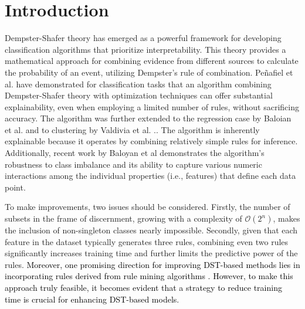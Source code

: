 \documentclass[10pt,a4paper,oneside]{article}
\begin{document}
{\selectfont
\begin{keywords}
{\fontsize{9pt}{9pt}\selectfont{
Dempster-Shafer Theory, Interpretability, KMeans, Mass Assignment Functions, Classification}}
\end{keywords}
}

{\selectfont
\begin{category}
{\fontsize{9pt}{9pt}\selectfont{
I.2.6, I.5, G.3
}}
\end{category}}




\section{Introduction}\label{sec1}
Dempster-Shafer theory \cite{dst} has emerged as a powerful framework for developing classification algorithms that prioritize interpretability. This theory provides a mathematical approach for combining evidence from different sources to calculate the probability of an event, utilizing Dempster's rule of combination. Peñafiel et al. \cite{sergio} have demonstrated {\color{black} for classification tasks} that an algorithm combining Dempster-Shafer theory with optimization techniques can offer substantial explainability, even when employing a limited number of rules, without sacrificing accuracy. {\color{black} The algorithm was further extended to the regression case by Baloian et al. \cite{Nelson} and to clustering by Valdivia et al. \cite{dsClustering}.}. The algorithm is inherently explainable because it operates by combining relatively simple rules for inference. {\color{black}Additionally, recent work by Baloyan et al \cite{Aneta} demonstrates {\color{black}the} algorithm's robustness to class imbalance and its ability to capture various numeric interactions {\color{black} among the individual properties (i.e., features) that define each data point.}}

To make improvements, two issues should be considered.  Firstly, the number of subsets in the frame of discernment, growing with a complexity of $\mathcal{O}(2^n)$, makes the inclusion of non-singleton classes nearly impossible. Secondly, given that each feature in the dataset typically generates three rules, combining even two rules significantly increases training time and further limits the predictive power of the rules. 
\textcolor{black}
{
Moreover, one promising direction for improving DST-based methods lies in incorporating rules derived from rule mining algorithms \cite{ripper, c5, skoperules}. However, to make this approach truly feasible, it becomes evident that a strategy to reduce training time is crucial for enhancing DST-based models.
}
\end{document}
